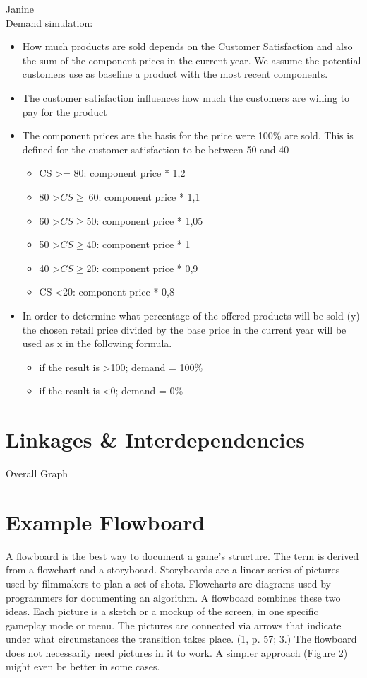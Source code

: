 \documentclass[11pt,titlepage,oneside,openany]{book}
\begin{document}
Janine \\
Demand simulation: 
\begin{itemize}
\item How much products are sold depends on the Customer Satisfaction and also the sum of the component prices in the current year. We assume the potential customers use as baseline a product with the most recent components. 
\item The customer satisfaction influences how much the customers are willing to pay for the product 
\item The component prices are the basis for the price were 100\% are sold. This is defined for the customer satisfaction to be between 50 and 40
\begin{itemize}
\item CS >= 80: component price * 1,2 
\item 80 \textgreater $CS \geq \ $60: component price * 1,1
\item 60 \textgreater $CS \geq $50: component price * 1,05
\item 50 \textgreater $CS \geq $40: component price * 1
\item 40 \textgreater $CS \geq $20: component price * 0,9
\item CS \textless 20: component price * 0,8
\end{itemize}
\item In order to determine what percentage of the offered products will be sold (y) the chosen retail price divided by the base price in the current year will be used as x in the following formula.
\begin{equation}
\end{equation}
\begin{itemize}
    \item if the result is \textgreater 100; demand = 100\%
    \item if the result is \textless 0; demand = 0\%
\end{itemize}
\end{itemize}

\section{Linkages \& Interdependencies}
\label{sec:link}
Overall Graph

\section{Example Flowboard}
A flowboard is the best way to document a game’s structure. The term is derived
from a flowchart and a storyboard. Storyboards are a linear series of pictures
used by filmmakers to plan a set of shots. Flowcharts are diagrams used
by programmers for documenting an algorithm. A flowboard combines these
two ideas. Each picture is a sketch or a mockup of the screen, in one specific
gameplay mode or menu. The pictures are connected via arrows that indicate
under what circumstances the transition takes place. (1, p. 57; 3.) The flowboard
does not necessarily need pictures in it to work. A simpler approach (Figure
2) might even be better in some cases.
\end{document}
